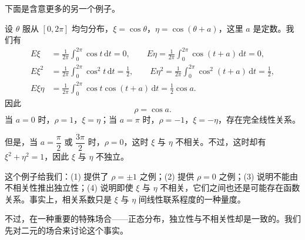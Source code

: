 \documentclass[../../main.tex]{subfiles}
\begin{document}
下面是含意更多的另一个例子。

\begin{example}[圆周上的均匀分布]\label{example:ch04-圆周均匀}
设 $\theta$ 服从 $[0,2\pi]$ 均匀分布，$\xi=\cos\theta$，$\eta=\cos(\theta+a)$，这里 $a$ 是定数。我们有
\begin{align*}
E\xi&=\frac{1}{2\pi}\int_0^{2\pi}\cos t\,\mathrm{d}t=0,\qquad
E\eta=\frac{1}{2\pi}\int_0^{2\pi}\cos(t+a)\,\mathrm{d}t=0,\\
E\xi^2&=\frac{1}{2\pi}\int_0^{2\pi}\cos^2 t\,\mathrm{d}t=\frac12,\qquad
E\eta^2=\frac{1}{2\pi}\int_0^{2\pi}\cos^2(t+a)\,\mathrm{d}t=\frac12,\\
E\xi\eta&=\frac{1}{2\pi}\int_0^{2\pi}\cos t\cos(t+a)\,\mathrm{d}t=\frac12\cos a.
\end{align*}
因此
\[
\rho=\cos a.
\]
当 $a=0$ 时，$\rho=1$，$\xi=\eta$；当 $a=\pi$ 时，$\rho=-1$，$\xi=-\eta$，存在完全线性关系。

但是，当 $a=\dfrac{\pi}{2}$ 或 $\dfrac{3\pi}{2}$ 时，$\rho=0$，这时 $\xi$ 与 $\eta$ 不相关。不过，这时却有 $\xi^2+\eta^2=1$，因此 $\xi$ 与 $\eta$ 不独立。

这个例子给我们：(1) 提供了 $\rho=\pm 1$ 之例；(2) 提供 $\rho=0$ 之例；(3) 说明不能由不相关性推出独立性；(4) 说明即使 $\xi$ 与 $\eta$ 不相关，它们之间也还是可能存在函数关系。事实上，相关系数只是 $\xi$ 与 $\eta$ 间线性联系程度的一种量度。
\end{example}

不过，在一种重要的特殊场合——正态分布，独立性与不相关性却是一致的。我们先对二元的场合来讨论这个事实。
\end{document}
